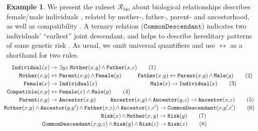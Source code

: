 \documentclass[10pt,a4paper]{amsart}
\theoremstyle{definition}
\newtheorem{exa}[exa]{Example}
\numberwithin{equation}{section}
\theoremstyle{plain}
\theoremstyle{definition}
\newtheorem{example}[example]{Example}
\theoremstyle{myexample}
\renewenvironment{example}%
{
	\begin{shaded*}	
		\vspace{-1.5ex}
		\begin{exa}%
		}{
		\end{exa}
		\vspace{-1.5ex}
	\end{shaded*}
}
\theoremstyle{plain}
\theoremstyle{definition}
\newcommand{\ruleset}{\calr}
\newcommand{\calr}{\mathcal{R}}
\newcommand{\pred}[1]{\mathtt{#1}}
\begin{document}
\begin{example}\label{ex:Rbio}
We present the ruleset $\ruleset_\mathrm{bio}$ about biological relationships describes female/male individuals%
, related by mother-, father-, parent- and ancestorhood, as well as compatibility%
. A ternary relation ($\pred{CommonDescendant}$) indicates two individuals' ``earliest'' joint descendant, and helps to describe hereditary patterns of some genetic risk%
. As usual, we omit universal quantifiers and use $\leftrightarrow$ as a shorthand for two rules.
{\small
	\begin{align}
		\pred{Individual}(x) \to & \ \exists yz.\pred{Mother}(x,\!y) {\,\wedge\,} \pred{Father}(x,\!z) \tag{1}\\[-1pt]
		\pred{Mother}(x,\!y) \leftrightarrow & \ \pred{Parent}(x,\!y) {\,\wedge\,} \pred{Female}(y) \ \  \hspace{5ex} \pred{Father}(x,\!y) \leftrightarrow \pred{Parent}(x,\!y) {\,\wedge\,} \pred{Male}(y) \tag{2}\\[-1pt]
		\pred{Female}(x) \to  & \ \pred{Individual}(x) \hspace{21.3ex}  \pred{Male}(x) \to  \pred{Individual}(x) \tag{3}\\[-1pt]
		\pred{Compatible}(x,\!y) \leftrightarrow & \ \pred{Female}(x) \wedge \pred{Male}(y)   \tag{4}\\[-1pt]
		\pred{Parent}(x,\!y) \to & \ \pred{Ancestor}(x,\!y) \hspace{5.8ex} \pred{Ancestor}(x,\!y) {\,\wedge\,} \pred{Ancestor}(y,\!z) \to \pred{Ancestor}(x,\!z) \tag{5}\\[-1pt]
		& \!\hspace{-21ex} \pred{Mother}(x,\!y) {\,\wedge\,} \pred{Ancestor}(y,\!y') {\,\wedge\,} \pred{Father}(x,\!z) {\,\wedge\,} \pred{Ancestor}(z,\!z') \to \pred{CommonDescendant}(x,\!y'\!,\!z') \tag{6}\\[-1pt]
		& \!\hspace{18ex}  \pred{Risk}(x) {\,\wedge\,} \pred{Mother}(x,y) \to \pred{Risk}(y) \tag{7}\\[-1pt]
		& \hspace{-6ex} \pred{CommonDescendant}(x,\!y,\!z) {\,\wedge\,} \pred{Risk}(y) {\,\wedge\,} \pred{Risk}(z) \to \pred{Risk}(x) \tag{8}
	\end{align}}
\vspace{-4ex}
\end{example}
\end{document}
